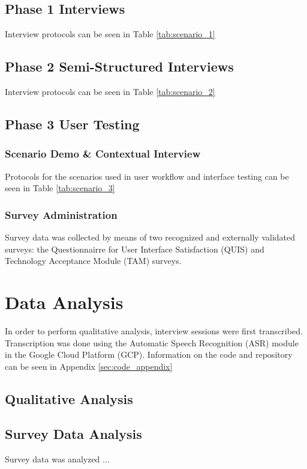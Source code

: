\subsection{Phase 1 Interviews}
Interview protocols can be seen in Table \ref{tab:scenario_1}


\subsection{Phase 2 Semi-Structured Interviews}
Interview protocols can be seen in Table \ref{tab:scenario_2}


\subsection{Phase 3 User Testing}
\subsubsection{Scenario Demo \& Contextual Interview}
Protocols for the scenarios used in user workflow and interface testing can be seen in Table \ref{tab:scenario_3}
\subsubsection{Survey Administration}
Survey data was collected by means of two recognized and externally validated surveys: the Questionnairre for User Interface Satisfaction (QUIS) and Technology Acceptance Module (TAM) surveys.


\section{Data Analysis}
In order to perform qualitative analysis, interview sessions were first transcribed. Transcription was done using the Automatic Speech Recognition (ASR) module in the Google Cloud Platform (GCP). Information on the code and repository can be seen in Appendix \ref{sec:code_appendix}
\subsection{Qualitative Analysis}
\subsection{Survey Data Analysis}
Survey data was analyzed ...




